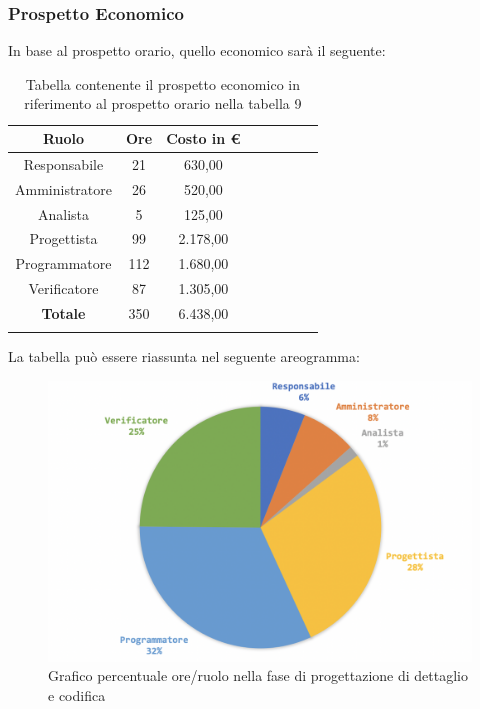 		\subsubsection{Prospetto Economico}
		In base al prospetto orario, quello economico sarà il seguente: 
		
		\begin{longtable}{|c|c|c|c|c|c|c|c|}
			\hline
			\rowcolor{lighter-grayer}
			\textbf{Ruolo} & \textbf{Ore} & \textbf{Costo in € } \\
			\hline
			\endfirsthead
			
			\hline
			Responsabile 	    & 21 & 630,00\\
			\hline 
			\hline
			Amministratore	  & 26 & 520,00\\
			\hline
			\hline
			Analista 				& 5 & 125,00\\
			\hline
			\hline
			Progettista 		  & 99 & 2.178,00\\
			\hline
			\hline
			Programmatore 	 & 112 & 1.680,00\\
			\hline
			\hline
			Verificatore 		  & 87 & 1.305,00\\
			\hline
			\textbf{Totale} 	& 350 & 6.438,00\\
			\hline
			\caption{Tabella contenente il prospetto economico in riferimento al prospetto orario nella tabella 9}
		\end{longtable}
		\pagebreak
		
		La tabella può essere riassunta nel seguente areogramma:
		\begin{figure}[H]
			\centering
			\includegraphics[width=0.8\linewidth]{./images/progDetCod2.png}
			\caption{Grafico percentuale ore/ruolo nella fase di progettazione di dettaglio e codifica}
			\label{fig:grafico costi ruolo fase progettazione dettaglio e codifica}
		\end{figure}
	
